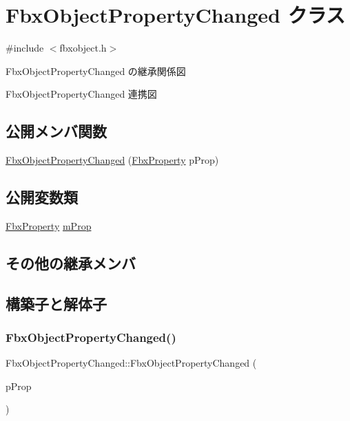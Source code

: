\hypertarget{class_fbx_object_property_changed}{}\section{Fbx\+Object\+Property\+Changed クラス}
\label{class_fbx_object_property_changed}


{\ttfamily \#include $<$fbxobject.\+h$>$}



Fbx\+Object\+Property\+Changed の継承関係図


Fbx\+Object\+Property\+Changed 連携図
\subsection*{公開メンバ関数}
\begin{DoxyCompactItemize}
\item 
\hyperlink{class_fbx_object_property_changed_a48bdf8b5f7fb7f5e0b2a87cc00f9876b}{Fbx\+Object\+Property\+Changed} (\hyperlink{class_fbx_property}{Fbx\+Property} p\+Prop)
\end{DoxyCompactItemize}
\subsection*{公開変数類}
\begin{DoxyCompactItemize}
\item 
\hyperlink{class_fbx_property}{Fbx\+Property} \hyperlink{class_fbx_object_property_changed_a941055bc705ac87af79a63c46fb7a5a0}{m\+Prop}
\end{DoxyCompactItemize}
\subsection*{その他の継承メンバ}


\subsection{構築子と解体子}
\mbox{\label{class_fbx_object_property_changed_a48bdf8b5f7fb7f5e0b2a87cc00f9876b}} 
\subsubsection{\texorpdfstring{Fbx\+Object\+Property\+Changed()}{FbxObjectPropertyChanged()}}
{\footnotesize\ttfamily Fbx\+Object\+Property\+Changed\+::\+Fbx\+Object\+Property\+Changed (\begin{DoxyParamCaption}\item[{\hyperlink{class_fbx_property}{Fbx\+Property}}]{p\+Prop }\end{DoxyParamCaption})}



